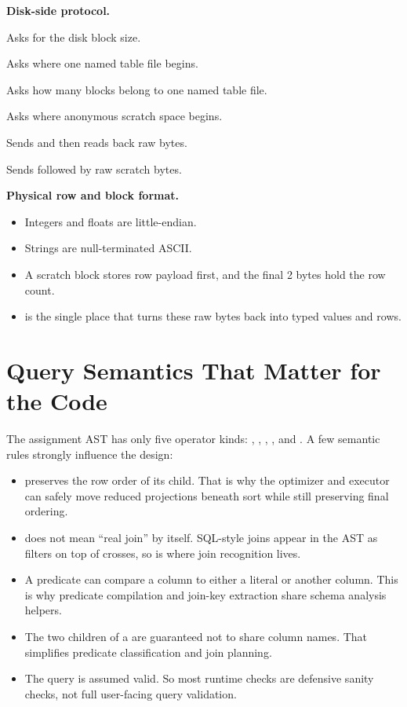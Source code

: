 \documentclass[11pt]{article}
\newcommand{\func}[2]{\item[\mbox{\path{#1}}] #2}
\begin{document}
\textbf{Disk-side protocol.}
\begin{description}[leftmargin=2.8cm, style=nextline]
    \func{get_block_size}{Asks for the disk block size.}
    \func{get_file_start_block}{Asks where one named table file begins.}
    \func{get_file_num_blocks}{Asks how many blocks belong to one named table file.}
    \func{get_anon_start_block}{Asks where anonymous scratch space begins.}
    \func{read_blocks}{Sends  and then reads back raw bytes.}
    \func{write_blocks}{Sends  followed by raw scratch bytes.}
\end{description}

\textbf{Physical row and block format.}
\begin{itemize}[leftmargin=*]
    \item Integers and floats are little-endian.
    \item Strings are null-terminated ASCII.
    \item A scratch block stores row payload first, and the final 2 bytes hold the row count.
    \item {} is the single place that turns these raw bytes back into typed values and rows.
\end{itemize}

\section{Query Semantics That Matter for the Code}
The assignment AST has only five operator kinds: , , , , and . A few semantic rules strongly influence the design:

\begin{itemize}[leftmargin=*]
    \item {} preserves the row order of its child. That is why the optimizer and executor can safely move reduced projections beneath sort while still preserving final ordering.
    \item {} does not mean ``real join'' by itself. SQL-style joins appear in the AST as filters on top of crosses, so  is where join recognition lives.
    \item A predicate can compare a column to either a literal or another column. This is why predicate compilation and join-key extraction share schema analysis helpers.
    \item The two children of a  are guaranteed not to share column names. That simplifies predicate classification and join planning.
    \item The query is assumed valid. So most runtime checks are defensive sanity checks, not full user-facing query validation.
\end{itemize}
\end{document}

